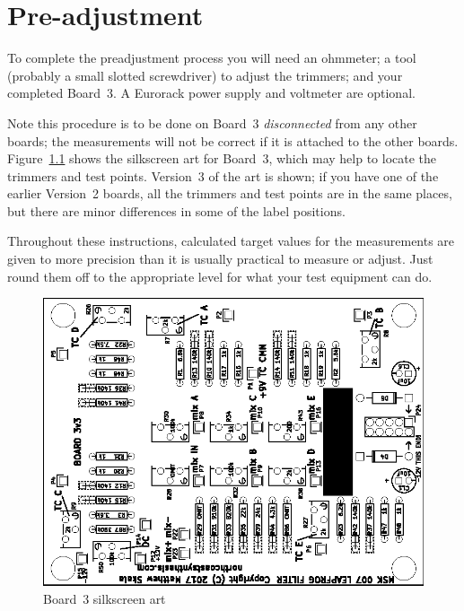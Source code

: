 
%
%
%
%
%
%

\chapter{Pre-adjustment}\label{ch:preadj}

To complete the preadjustment process you will need an
ohmmeter; a tool (probably a small slotted screwdriver) to adjust the
trimmers; and your completed Board~3.  A Eurorack power supply and voltmeter
are optional.

Note this procedure is to be done on
Board~3 \emph{disconnected} from any other boards; the measurements will not
be correct if it is attached to the other boards. 
Figure~\ref{fig:board3-silk} shows the silkscreen art for Board~3, which may
help to locate the trimmers and test points.  Version~3 of the art is
shown; if you have one of the earlier Version~2 boards, all the trimmers and
test points are in the same places, but there are minor differences in some
of the label positions.

Throughout these instructions, calculated target values for the measurements
are given to more precision than it is usually practical to measure or
adjust.  Just round them off to the appropriate level for what your test
equipment can do.

\begin{figure}
\centering\includegraphics[angle=-90,scale=1.5]{board3-silk.eps}
\caption{Board~3 silkscreen art}\label{fig:board3-silk}
\end{figure}

